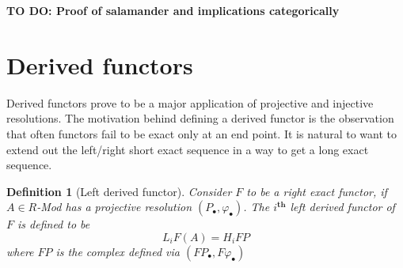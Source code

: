 \documentclass[12pt]{article}
\numberwithin{equation}{section}
\newtheorem{definition}{Definition}[section]
\begin{document}
	
	\textbf{TO DO: Proof of salamander and implications categorically}
	\section{Derived functors}
	
	Derived functors prove to be a major application of projective and injective resolutions. The motivation behind defining a derived functor is the observation that often functors fail to be exact only at an end point. It is natural to want to extend out the left/right short exact sequence in a way to get a long exact sequence.
	\begin{definition}[Left derived functor]
		Consider $F$ to be a right exact functor, if $A \in R$-Mod has a projective resolution $(P_\bullet, \varphi_\bullet)$. The $i^\textbf{th}$ left derived functor of $F$ is defined to be \[ L_iF(A)=H_i FP \] where $FP$ is the complex defined via $(FP_\bullet,F\varphi_\bullet)$
	\end{definition}
	
\end{document}
